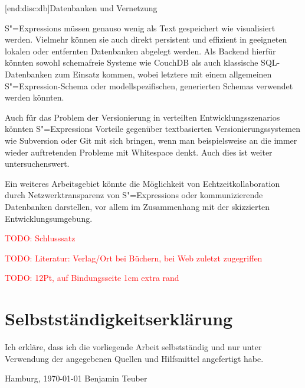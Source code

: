 \documentclass[12pt, a4paper, bibgerm]{scrbook}
\newcommand{\todo}[1]{
  \textcolor{red}{TODO: #1}
}
\newcommand\lsubsection{}
\newcommand{\sexp}{S"=Expression}
\newcommand{\sexps}{S"=Expressions}
\begin{document}
\lsubsection[end:disc:db]{Datenbanken und Vernetzung}

\sexps{} müssen genauso wenig als Text gespeichert wie visualisiert
werden. Vielmehr können sie auch direkt persistent und effizient in
geeigneten lokalen oder entfernten Datenbanken abgelegt werden. Als
Backend hierfür könnten sowohl schemafreie Systeme wie
CouchDB \cite{CouchDB} als auch klassische SQL-Datenbanken zum Einsatz
kommen, wobei letztere mit einem allgemeinen \sexp{}-Schema oder
modellspezifischen, generierten Schemas verwendet werden könnten.

Auch für das Problem der Versionierung in verteilten
Entwicklungsszenarios könnten \sexps{} Vorteile gegenüber textbasierten
Versionierungssystemen wie Subversion \cite{Svn} oder Git \cite{Git} mit
sich bringen, wenn man beispielsweise an die immer wieder auftretenden
Probleme mit Whitespace denkt. Auch dies ist weiter untersuchenswert.

Ein weiteres Arbeitsgebiet könnte die Möglichkeit von
Echtzeitkollaboration durch Netzwerktransparenz von \sexps{}
oder kommunizierende Datenbanken darstellen, vor allem im Zusammenhang
mit der skizzierten Entwicklungsumgebung.

\medskip{} 
\todo{Schlusssatz}
\todo{Literatur: Verlag/Ort bei Büchern, bei Web zuletzt zugegriffen}
\todo{12Pt, auf Bindungsseite 1cm extra rand}


\cleardoublepage





\listoffigures
{}

\chapter*{Selbstständigkeitserklärung}

Ich erkläre, dass ich die vorliegende Arbeit selbstständig und nur unter
Verwendung der angegebenen Quellen und Hilfsmittel angefertigt habe.
\vskip 2cm
\begin{flushright}
Hamburg, \today
\vskip 1cm
Benjamin Teuber
\end{flushright}
\end{document}
